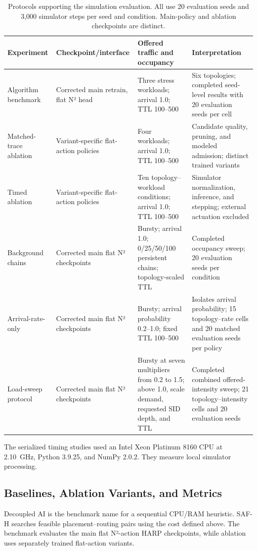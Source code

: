 \documentclass[final,5p]{elsarticle}
\newcommand{\rev}[1]{\textcolor{revisiongreen}{#1}}
\let\newrev\rev
\begin{document}
\begin{table}[t]
\centering
\caption{\newrev{Protocols supporting the simulation evaluation. All use 20 evaluation seeds and 3,000 simulator steps per seed and condition. Main-policy and ablation checkpoints are distinct.}}
\label{tab:evaluation_protocols}
\color{revisiongreen}
\scriptsize
\begin{tabular}{p{}p{}p{}p{}}
\toprule
Experiment & Checkpoint/interface & Offered traffic and occupancy & Interpretation \\
\midrule
Algorithm benchmark & Corrected main retrain, flat N² head & Three stress workloads; arrival 1.0; TTL 100--500 & Six topologies; completed seed-level results with 20 evaluation seeds per cell \\
Matched-trace ablation & Variant-specific flat-action policies & Four workloads; arrival 1.0; TTL 100--500 & Candidate quality, pruning, and modeled admission; distinct trained variants \\
Timed ablation & Variant-specific flat-action policies & Ten topology--workload conditions; arrival 1.0; TTL 100--500 & Simulator normalization, inference, and stepping; external actuation excluded \\
Background chains & Corrected main flat N² checkpoints & Bursty; arrival 1.0; 0/25/50/100 persistent chains; topology-scaled TTL & Completed occupancy sweep; 20 evaluation seeds per condition \\
Arrival-rate-only & Corrected main flat N² checkpoints & Bursty; arrival probability 0.2--1.0; fixed TTL 100--500 & Isolates arrival probability; 15 topology--rate cells and 20 matched evaluation seeds per policy \\
Load-sweep protocol & Corrected main flat N² checkpoints & Bursty at seven multipliers from 0.2 to 1.5; above 1.0, scale demand, requested SID depth, and TTL & Completed combined offered-intensity sweep; 21 topology--intensity cells and 20 evaluation seeds \\
\bottomrule
\end{tabular}
\end{table}

\newrev{The serialized timing studies used an Intel Xeon Platinum 8160 CPU at 2.10~GHz, Python 3.9.25, and NumPy 2.0.2. They measure local simulator processing.}

\subsection{\newrev{Baselines, Ablation Variants, and Metrics}}
\label{subsec:baselines_metrics}
\newrev{Decoupled AI is the benchmark name for a sequential CPU/RAM heuristic. SAF-H searches feasible placement--routing pairs using the cost defined above. The benchmark evaluates the main flat N²-action HARP checkpoints, while ablation uses separately trained flat-action variants.}
\end{document}
